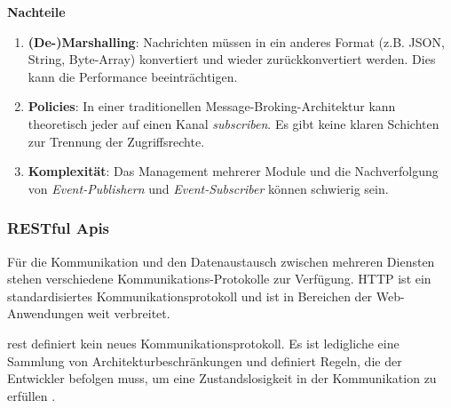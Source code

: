 \textbf{Nachteile}

\begin{enumerate}
    \item \textbf{(De-)Marshalling}: Nachrichten müssen in ein anderes Format (z.B. JSON, String, Byte-Array) konvertiert und wieder zurückkonvertiert werden. Dies kann die Performance beeinträchtigen.
    \item \textbf{Policies}: In einer traditionellen Message-Broking-Architektur kann theoretisch jeder auf einen Kanal \textit{subscriben}. Es gibt keine klaren Schichten zur Trennung der Zugriffsrechte.
    \item \textbf{Komplexität}: Das Management mehrerer Module und die Nachverfolgung von \textit{Event-Publishern} und \textit{Event-Subscriber} können schwierig sein.
\end{enumerate}

\subsubsection{RESTful Apis} \label{cha:grundlagen:collaboration:rest}

Für die Kommunikation und den Datenaustausch zwischen mehreren Diensten stehen verschiedene Kommunikations-Protokolle zur Verfügung. HTTP ist ein standardisiertes Kommunikationsprotokoll und ist in Bereichen der Web-Anwendungen weit verbreitet.

\ac{rest} definiert kein neues Kommunikationsprotokoll. Es ist ledigliche eine Sammlung von Architekturbeschränkungen und definiert Regeln, die der Entwickler befolgen muss, um eine Zustandslosigkeit in der Kommunikation zu erfüllen \autocite{RedHat2023}.


